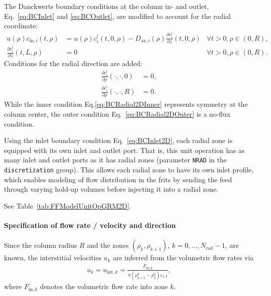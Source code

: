 The Danckwerts boundary conditions at the column in- and outlet, Eq.~\eqref{eq:BCInlet} and \eqref{eq:BCOutlet}, are modified to account for the radial coordinate:
\begin{subequations}\label{eq:BCAxial2D}
\begin{align}
	u(\rho) c_{\text{in},i}(t,\rho) &= u(\rho) c^l_i(t,0,\rho) - D_{\text{ax},i}(\rho) \frac{\partial c^l_i}{\partial z}(t, 0, \rho) \label{eq:BCInlet2D} & \forall t > 0, \rho \in (0,R), \\
	\frac{\partial c^l_i}{\partial z}(t, L, \rho) &= 0 & \forall t > 0, \rho \in (0,R). \label{eq:BCOutlet2D}
\end{align}
\end{subequations}
Conditions for the radial direction are added:
\begin{subequations}\label{eq:BCRadial2D}
\begin{align}
	\frac{\partial{c^l_i}}{\partial \rho}(\cdot, \cdot, 0) &= 0, \label{eq:BCRadial2DInner} \\
	\frac{\partial{c^l_i}}{\partial \rho}(\cdot, \cdot, R) &= 0. \label{eq:BCRadial2DOuter}
\end{align}
\end{subequations}
While the inner condition Eq.\eqref{eq:BCRadial2DInner} represents symmetry at the column center, the outer condition Eq.~\eqref{eq:BCRadial2DOuter} is a no-flux condition.

Using the inlet boundary condition Eq.~\eqref{eq:BCInlet2D}, each radial zone is equipped with its own inlet and outlet port.
That is, this unit operation has as many inlet and outlet ports as it has radial zones (parameter \texttt{NRAD} in the \texttt{discretization} group).
This allows each radial zone to have its own inlet profile, which enables modeling of flow distribution in the frits by sending the feed through varying hold-up volumes before injecting it into a radial zone.

See Table~\ref{tab:FFModelUnitOpGRM2D}.

\paragraph{Specification of flow rate / velocity and direction}
\label{par:MUOPGRMflow2D}

Since the column radius $R$ and the zones $(\rho_k, \rho_{k+1})$, $k = 0, \dots, N_{\text{rad}} - 1$, are known, the interstitial velocities $u_k$ are inferred from the volumetric flow rates via
\begin{align*}
	u_k = u_{\text{int},k} = \frac{F_{\text{in},k}}{\pi \left( \rho_{k+1}^2 - \rho_k^2 \right) \varepsilon_{c,k}},
\end{align*}
where $F_{\text{in},k}$ denotes the volumetric flow rate into zone $k$.

